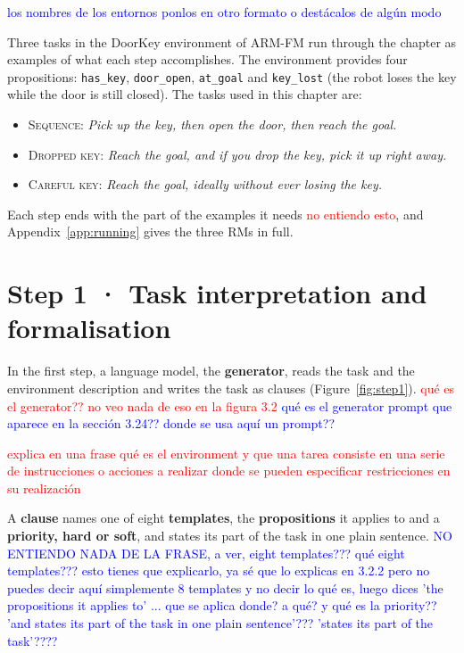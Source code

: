 \documentclass[11pt,english,listoffigures,listoftables]{tfgetsinf}
\newcommand{\runex}[1]{\textsc{#1}}  %
\begin{document}
\textcolor{blue}{los nombres de los entornos ponlos en otro formato o destácalos de algún modo}

Three tasks in the DoorKey environment of ARM-FM run through the chapter as examples of what each step accomplishes. The environment provides four propositions: \texttt{has\_key}, \texttt{door\_open}, \texttt{at\_goal} and \texttt{key\_lost} (the robot loses the key while the door is still closed). The tasks used in this chapter are:
\begin{itemize}
    \item \runex{Sequence}: \textit{Pick up the key, then open the door, then reach the goal.}
    \item \runex{Dropped key}: \textit{Reach the goal, and if you drop the key, pick it up right away.}
    \item \runex{Careful key}: \textit{Reach the goal, ideally without ever losing the key.}
\end{itemize}

Each step ends with the part of the examples it needs \textcolor{red}{no entiendo esto}, and Appendix~\ref{app:running} gives the three RMs in full. 

\section{Step 1 · Task interpretation and formalisation}
\label{sec:step1}
In the first step, a language model, the \textbf{generator}, reads the task and the environment description and writes the task as clauses (Figure~\ref{fig:step1}). \textcolor{red}{qué es el generator?? no veo nada de eso en la figura 3.2} \textcolor{blue}{qué es el generator prompt que aparece en la sección 3.24?? donde se usa aquí un prompt??}

\textcolor{red}{explica en una frase qué es el environment y que una tarea consiste en una serie de instrucciones o acciones a realizar donde se pueden especificar restricciones en su realización}


A \textbf{clause} names one of eight \textbf{templates}, the \textbf{propositions} it applies to and a \textbf{priority, hard or soft}, and states its part of the task in one plain sentence.  \textcolor{blue}{NO ENTIENDO NADA DE LA FRASE, a ver, eight templates??? qué eight templates??? esto tienes que explicarlo, ya sé que lo explicas en 3.2.2 pero no puedes decir aquí simplemente 8 templates y no decir lo qué es, luego dices 'the propositions it applies to' ... que se aplica donde? a qué? y qué es la priority?? 'and states its part of the task in one plain sentence'??? 'states its part of the task'????  }
\end{document}
